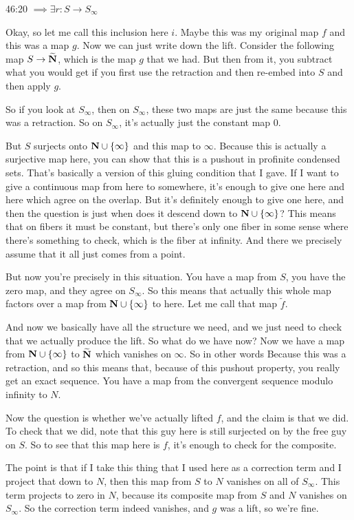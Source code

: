 \begin{unfinished}{46:20}
$ \implies \exists r: S \to S_{\infty}$

Okay, so let me call this inclusion here $i$. Maybe this was my original map $f$ and this was a map $g$. Now we can just write down the lift. Consider the following map $S \to \widetilde{\mathbf N}$, which is the map $g$ that we had. But then from it, you subtract what you would get if you first use the retraction and then re-embed into $S$ and then apply $g$.

So if you look at $S_\infty$, then on $S_\infty$, these two maps are just the same because this was a retraction. So on $S_\infty$, it's actually just the constant map $0$.

But $S$ surjects onto $\mathbf N \cup \{\infty\}$ and this map to $\infty$. Because this is actually a surjective map here, you can show that this is a pushout in profinite condensed sets. That's basically a version of this gluing condition that I gave. If I want to give a continuous map from here to somewhere, it's enough to give one here and here which agree on the overlap. But it's definitely enough to give one here, and then the question is just when does it descend down to $\mathbf N \cup \{\infty\}$? This means that on fibers it must be constant, but there's only one fiber in some sense where there's something to check, which is the fiber at infinity. And there we precisely assume that it all just comes from a point.

But now you're precisely in this situation. You have a map from $S$, you have the zero map, and they agree on $S_\infty$. So this means that actually this whole map factors over a map from $\mathbf N \cup \{\infty\}$ to here. Let me call that map $\widetilde{f}$.

And now we basically have all the structure we need, and we just need to check that we actually produce the lift. So what do we have now? Now we have a map from $\mathbf N \cup \{\infty\}$ to $\widetilde{\mathbf N}$ which vanishes on $\infty$. So in other words
Because this was a retraction, and so this means that, because of this pushout property, you really get an exact sequence. You have a map from the convergent sequence modulo infinity to $N$.

Now the question is whether we've actually lifted $f$, and the claim is that we did. To check that we did, note that this guy here is still surjected on by the free guy on $S$. So to see that this map here is $f$, it's enough to check for the composite.

The point is that if I take this thing that I used here as a correction term and I project that down to $N$, then this map from $S$ to $N$ vanishes on all of $S_\infty$. This term projects to zero in $N$, because its composite map from $S$ and $N$ vanishes on $S_\infty$. So the correction term indeed vanishes, and $g$ was a lift, so we're fine.


\end{unfinished}
